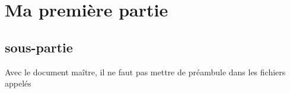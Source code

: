 \section{Ma première partie}

\subsection{sous-partie}

Avec le document maître, il ne faut pas mettre de préambule dans les fichiers appelés



